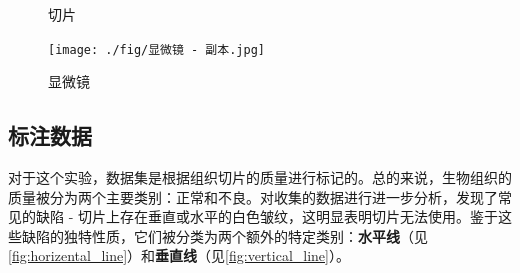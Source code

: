 \begin{figure}[H]
\begin{minipage}{0.3\textwidth}
        \caption{切片}
        \label{fig:采集样本}
    \end{minipage}
    \begin{minipage}{0.35\textwidth}
        \centering
        \texttt{[image: ./fig/显微镜 - 副本.jpg]}
        \caption{显微镜}
        \label{fig:显微镜}
    \end{minipage}
\end{figure}






\subsection{标注数据}

对于这个实验，数据集是根据组织切片的质量进行标记的。总的来说，生物组织的质量被分为两个主要类别：正常和不良。对收集的数据进行进一步分析，发现了常见的缺陷 - 切片上存在垂直或水平的白色皱纹，这明显表明切片无法使用。鉴于这些缺陷的独特性质，它们被分类为两个额外的特定类别：\textbf{水平线}（见\autoref{fig:horizental_line}）和\textbf{垂直线}（见\autoref{fig:vertical_line}）。

